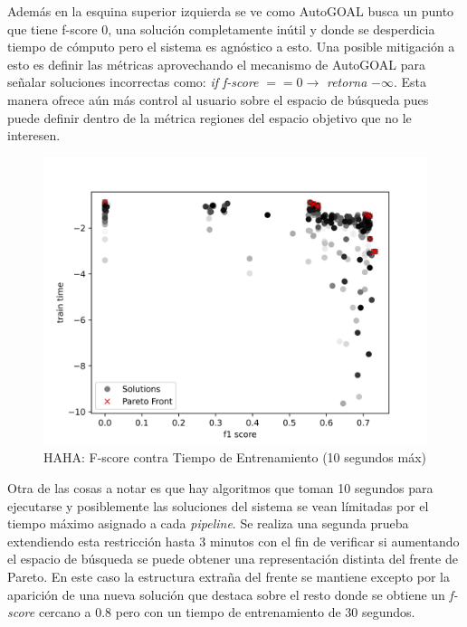 Adem\'as en la esquina superior izquierda se ve como AutoGOAL busca un punto que tiene f-score 0, una soluci\'on completamente in\'util y donde se desperdicia tiempo de c\'omputo pero el sistema es agn\'ostico a esto. Una posible mitigaci\'on a esto es definir las m\'etricas aprovechando el mecanismo de AutoGOAL para se\~nalar soluciones incorrectas como: \textit{if f-score} $== 0 \rightarrow $ \textit{retorna} $-\infty$. Esta manera ofrece a\'un m\'as control al usuario sobre el espacio de b\'usqueda pues puede definir dentro de la m\'etrica regiones del espacio objetivo que no le interesen. 


\begin{figure}[ht]
    \centering
    \includegraphics[scale=0.65]{Pictures/haha_fscore_vs_time.jpg}
    \caption{HAHA: F-score contra Tiempo de Entrenamiento (10 segundos m\'ax)}
    \label{impl:fig:haha:fscore_vs_time}
\end{figure}

Otra de las cosas a notar es que hay algoritmos que toman 10 segundos para ejecutarse y posiblemente las soluciones del sistema se vean l\'imitadas por el tiempo m\'aximo asignado a cada \textit{pipeline}. Se realiza una segunda prueba extendiendo esta restricci\'on hasta 3 minutos con el fin de verificar si aumentando el espacio de b\'usqueda se puede obtener una representaci\'on distinta del frente de Pareto. En este caso la estructura extra\~na del frente se mantiene excepto por la aparici\'on de una nueva soluci\'on que destaca sobre el resto donde se obtiene un \textit{f-score} cercano a 0.8 pero con un tiempo de entrenamiento de 30 segundos.

